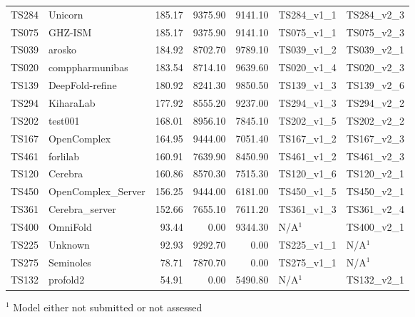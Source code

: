 \begin{table}[ht]
{\begin{tabular}{llrrrll}
TS284 & Unicorn & 185.17 & 9375.90 & 9141.10 & TS284\_v1\_1 & TS284\_v2\_3 \\ 
TS075 & GHZ-ISM & 185.17 & 9375.90 & 9141.10 & TS075\_v1\_1 & TS075\_v2\_3 \\ 
TS039 & arosko & 184.92 & 8702.70 & 9789.10 & TS039\_v1\_2 & TS039\_v2\_1 \\ 
TS020 & comppharmunibas & 183.54 & 8714.10 & 9639.60 & TS020\_v1\_4 & TS020\_v2\_3 \\ 
TS139 & DeepFold-refine & 180.92 & 8241.30 & 9850.50 & TS139\_v1\_3 & TS139\_v2\_6 \\ 
TS294 & KiharaLab & 177.92 & 8555.20 & 9237.00 & TS294\_v1\_3 & TS294\_v2\_2 \\ 
TS202 & test001 & 168.01 & 8956.10 & 7845.10 & TS202\_v1\_5 & TS202\_v2\_2 \\ 
TS167 & OpenComplex & 164.95 & 9444.00 & 7051.40 & TS167\_v1\_2 & TS167\_v2\_3 \\ 
TS461 & forlilab & 160.91 & 7639.90 & 8450.90 & TS461\_v1\_2 & TS461\_v2\_3 \\ 
TS120 & Cerebra & 160.86 & 8570.30 & 7515.30 & TS120\_v1\_6 & TS120\_v2\_1 \\ 
TS450 & OpenComplex\_Server & 156.25 & 9444.00 & 6181.00 & TS450\_v1\_5 & TS450\_v2\_1 \\ 
TS361 & Cerebra\_server & 152.66 & 7655.10 & 7611.20 & TS361\_v1\_3 & TS361\_v2\_4 \\ 
TS400 & OmniFold & 93.44 & 0.00 & 9344.30 & N/A$^{1}$ & TS400\_v2\_1 \\ 
TS225 & Unknown & 92.93 & 9292.70 & 0.00 & TS225\_v1\_1 & N/A$^{1}$ \\ 
TS275 & Seminoles & 78.71 & 7870.70 & 0.00 & TS275\_v1\_1 & N/A$^{1}$ \\ 
TS132 & profold2 & 54.91 & 0.00 & 5490.80 & N/A$^{1}$ & TS132\_v2\_1 \\ 
\bottomrule
\end{tabular}%
}
\begin{flushleft}\footnotesize $^{1}$ Model either not submitted or not assessed\end{flushleft}
\end{table}
